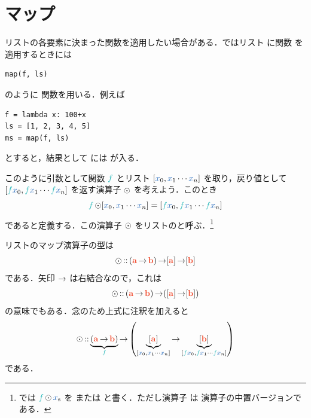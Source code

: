 \documentclass[a5paper,twoside,fleqn,draft]{jsbook}
\begin{document}
\section{マップ}

リストの各要素に決まった関数を適用したい場合がある．\python ではリスト  に関数  を適用するときには
\begin{pythoncode}
\begin{verbatim}
map(f, ls)
\end{verbatim}
\end{pythoncode}
のように  関数を用いる．例えば
\begin{pythoncode}
\begin{verbatim}
f = lambda x: 100+x
ls = [1, 2, 3, 4, 5]
ms = map(f, ls)
\end{verbatim}
\end{pythoncode}
とすると，結果として  には \code{[101, 102, 103, 104, 105]} が入る．

このように引数として関数 $\hFunc{f}$ とリスト $[\hVar{x}_0,\hVar{x}_1\dotsb \hVar{x}_n]$ を取り，戻り値として $[\hFunc{f}\hVar{x}_0,\hFunc{f}\hVar{x}_1\dotsb \hFunc{f}\hVar{x}_n]$ を返す演算子 $\operatorname{\odot}$ を考えよう．このとき
\begin{equation}
  \hFunc{f}\mMapList[\hVar{x}_0,\hVar{x}_1\dotsb \hVar{x}_n]
  =[\hFunc{f}\hVar{x}_0,\hFunc{f}\hVar{x}_1\dotsb \hFunc{f}\hVar{x}_n]
\end{equation}
であると定義する．この演算子 $\operatorname{\odot}$ をリストのと呼ぶ．\footnote{\haskell では $\hFunc{f}\mMapList\mList{x}$ を または  と書く．ただし演算子 \code{<\$>} は  演算子の中置バージョンである．}

リストのマップ演算子の型は
\begin{equation}
  \mMapList
  \mIn{}(\mA\mFuncArrow\mB)\mFuncArrow[\mA]\mFuncArrow[\mB]
\end{equation}
である．矢印 $\operatorname{\rightarrow}$ は右結合なので，これは
\begin{equation}
  \mMapList
  \mIn{}(\mA\mFuncArrow\mB)\mFuncArrow([\mA]\mFuncArrow[\mB])
\end{equation}
の意味でもある．念のため上式に注釈を加えると
\begin{equation}
  \mMapList
  \mIn\underbrace{\left(\mA\mFuncArrow\mB\right)}_{\hFunc{f}}
  \mFuncArrow\left(\underbrace{[\mA]}_{[\hVar{x}_0,\hVar{x}_1\dotsb \hVar{x}_n]}
  \mFuncArrow\underbrace{[\mB]}_{[\hFunc{f}\hVar{x}_0,\hFunc{f}\hVar{x}_1\dotsb \hFunc{f}\hVar{x}_n]}\right)
\end{equation}
である．
\end{document}
